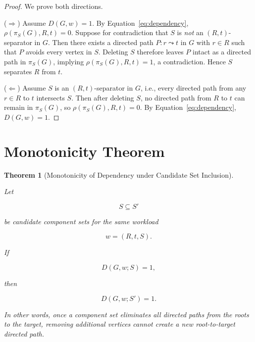 \documentclass[11pt]{article}
\newtheorem{theorem}{Theorem}
\begin{document}
\begin{proof}
We prove both directions.

($\Rightarrow$) Assume $D(G,w)=1$. By Equation~\ref{eq:dependency},
\(\rho(\pi_S(G),R,t)=0\). Suppose for contradiction that $S$ is \emph{not}
an $(R,t)$-separator in $G$. Then there exists a directed path
$P:r\leadsto t$ in $G$ with $r\in R$ such that $P$ avoids every vertex in
$S$. Deleting $S$ therefore leaves $P$ intact as a directed path in
$\pi_S(G)$, implying $\rho(\pi_S(G),R,t)=1$, a contradiction. Hence $S$
separates $R$ from $t$.

($\Leftarrow$) Assume $S$ is an $(R,t)$-separator in $G$, i.e., every
directed path from any $r\in R$ to $t$ intersects $S$. Then after deleting
$S$, no directed path from $R$ to $t$ can remain in $\pi_S(G)$, so
$\rho(\pi_S(G),R,t)=0$. By Equation~\ref{eq:dependency}, $D(G,w)=1$.
\end{proof}
\section{Monotonicity Theorem}
\label{sec:monotonicity}
\begin{theorem}[Monotonicity of Dependency under Candidate Set Inclusion]
\label{thm:monotonicity}

Let

\[
S \subseteq S'
\]

be candidate component sets for the same workload

\[
w=(R,t,S).
\]

If

\[
D(G,w;S)=1,
\]

then

\[
D(G,w;S')=1.
\]

In other words, once a component set eliminates all directed paths from
the roots to the target, removing additional vertices cannot create a new
root-to-target directed path.

\end{theorem}
\end{document}
